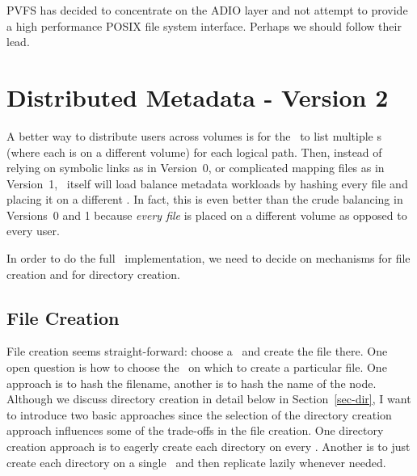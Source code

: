 \documentclass[10pt]{article}
\begin{document}
 
PVFS has decided to concentrate on the ADIO layer and not attempt to provide a
high performance POSIX file system interface.  Perhaps we should follow their
lead. 



\section{Distributed Metadata - Version 2}

A better way to distribute users across volumes is for the \plfsrc\ to list
multiple {\store}s (where each is on a different volume) for each logical path.
Then, instead of relying on symbolic links as in Version~0, or complicated
mapping files as in Version~1, \plfs\ itself will load balance metadata
workloads by hashing every file and placing it on a different \store.  In fact,
this is even better than the crude balancing in Versions~0 and 1 because {\em
every file} is placed on a different volume as opposed to every user. 

In order to do the full \mds\ implementation, we need to decide on mechanisms
for file creation and for directory creation.  

\subsection{File Creation}

File creation seems straight-forward: choose a \store\ and create the file
there.  One open question is how to choose the \store\ on which to create a
particular file.  One approach is to hash the filename, another is to hash the
name of the node.  Although we discuss directory creation in detail below in
Section~\ref{sec-dir}, I want to introduce two basic approaches since the
selection of the directory creation approach influences some of the trade-offs
in the file creation.  One directory creation approach is to eagerly create
each directory on every \store.  Another is to just create each directory on a
single \store\ and then replicate lazily whenever needed.
\end{document}
